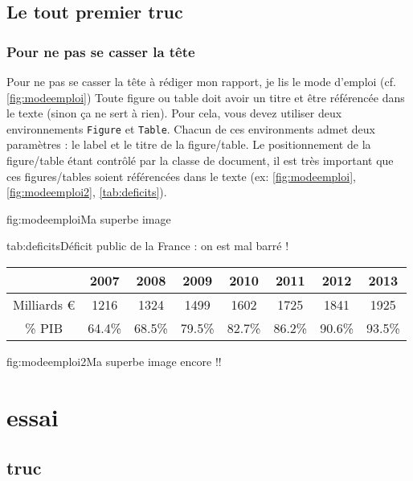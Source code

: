 \documentclass[overfullbox]{polytech/polytech}
\begin{document}
\chapter{Le tout premier truc}
\label{chap:toutpremier}

\lipsum[1]

\section{Pour ne pas se casser la tête}

\label{sec:cassetete}

Pour ne pas se casser la tête à rédiger mon rapport, je lis le mode d'emploi (cf. \ref{fig:modeemploi})
Toute figure ou table doit avoir un titre et être référencée dans le texte (sinon ça ne sert à rien).
Pour cela, vous devez utiliser deux environnements \texttt{Figure} et \texttt{Table}. Chacun de ces environments admet deux paramètres : le label et le titre de la figure/table. Le positionnement de la figure/table étant contrôlé par la classe de document, il est très important que ces figures/tables soient référencées dans le texte (ex: \autoref{fig:modeemploi}, \autoref{fig:modeemploi2}, \autoref{tab:deficits}).

\begin{Figure}{fig:modeemploi}{Ma superbe image}
\end{Figure}

\begin{Table}{tab:deficits}{Déficit public de la France : on est mal barré !}
\begin{tabu}{cccccccc}
	&2007	&2008	&2009	&2010	&2011	&2012	&2013\\\hline
Milliards \euro&1216	&1324	&1499	&1602	&1725	&1841	&1925\\\hline
\% PIB	&64.4\%	&68.5\%	&79.5\%	&82.7\%	&86.2\%	&90.6\%	&93.5\%\\\hline
\end{tabu}
\end{Table}

\begin{Figure}{fig:modeemploi2}{Ma superbe image encore !!}
\end{Figure}

\part{essai}
\label{part:essai}

\chapter{truc}
\lipsum[1-20]
\end{document}
